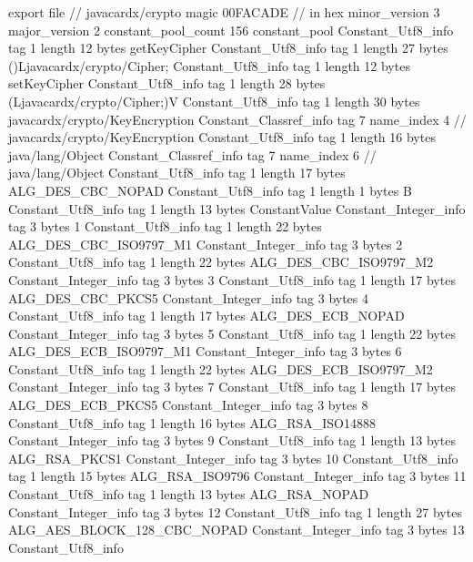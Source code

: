 export file {		// javacardx/crypto
	magic	00FACADE		 // in hex
	minor_version	3
	major_version	2
	constant_pool_count	156
	constant_pool {
		Constant_Utf8_info {
			tag	1
			length	12
			bytes	getKeyCipher
		}
		Constant_Utf8_info {
			tag	1
			length	27
			bytes	()Ljavacardx/crypto/Cipher;
		}
		Constant_Utf8_info {
			tag	1
			length	12
			bytes	setKeyCipher
		}
		Constant_Utf8_info {
			tag	1
			length	28
			bytes	(Ljavacardx/crypto/Cipher;)V
		}
		Constant_Utf8_info {
			tag	1
			length	30
			bytes	javacardx/crypto/KeyEncryption
		}
		Constant_Classref_info {
			tag	7
			name_index	4		// javacardx/crypto/KeyEncryption
		}
		Constant_Utf8_info {
			tag	1
			length	16
			bytes	java/lang/Object
		}
		Constant_Classref_info {
			tag	7
			name_index	6		// java/lang/Object
		}
		Constant_Utf8_info {
			tag	1
			length	17
			bytes	ALG_DES_CBC_NOPAD
		}
		Constant_Utf8_info {
			tag	1
			length	1
			bytes	B
		}
		Constant_Utf8_info {
			tag	1
			length	13
			bytes	ConstantValue
		}
		Constant_Integer_info {
			tag	3
			bytes	1
		}
		Constant_Utf8_info {
			tag	1
			length	22
			bytes	ALG_DES_CBC_ISO9797_M1
		}
		Constant_Integer_info {
			tag	3
			bytes	2
		}
		Constant_Utf8_info {
			tag	1
			length	22
			bytes	ALG_DES_CBC_ISO9797_M2
		}
		Constant_Integer_info {
			tag	3
			bytes	3
		}
		Constant_Utf8_info {
			tag	1
			length	17
			bytes	ALG_DES_CBC_PKCS5
		}
		Constant_Integer_info {
			tag	3
			bytes	4
		}
		Constant_Utf8_info {
			tag	1
			length	17
			bytes	ALG_DES_ECB_NOPAD
		}
		Constant_Integer_info {
			tag	3
			bytes	5
		}
		Constant_Utf8_info {
			tag	1
			length	22
			bytes	ALG_DES_ECB_ISO9797_M1
		}
		Constant_Integer_info {
			tag	3
			bytes	6
		}
		Constant_Utf8_info {
			tag	1
			length	22
			bytes	ALG_DES_ECB_ISO9797_M2
		}
		Constant_Integer_info {
			tag	3
			bytes	7
		}
		Constant_Utf8_info {
			tag	1
			length	17
			bytes	ALG_DES_ECB_PKCS5
		}
		Constant_Integer_info {
			tag	3
			bytes	8
		}
		Constant_Utf8_info {
			tag	1
			length	16
			bytes	ALG_RSA_ISO14888
		}
		Constant_Integer_info {
			tag	3
			bytes	9
		}
		Constant_Utf8_info {
			tag	1
			length	13
			bytes	ALG_RSA_PKCS1
		}
		Constant_Integer_info {
			tag	3
			bytes	10
		}
		Constant_Utf8_info {
			tag	1
			length	15
			bytes	ALG_RSA_ISO9796
		}
		Constant_Integer_info {
			tag	3
			bytes	11
		}
		Constant_Utf8_info {
			tag	1
			length	13
			bytes	ALG_RSA_NOPAD
		}
		Constant_Integer_info {
			tag	3
			bytes	12
		}
		Constant_Utf8_info {
			tag	1
			length	27
			bytes	ALG_AES_BLOCK_128_CBC_NOPAD
		}
		Constant_Integer_info {
			tag	3
			bytes	13
		}
		Constant_Utf8_info {
}}}
